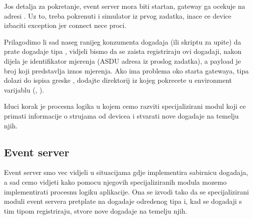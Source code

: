 \documentclass[letterpaper,10pt,croatian]{sphinxmanual}
\begin{document}
\begin{sphinxVerbatim}[commandchars=\\\{\}]
 


   
\end{sphinxVerbatim}

\sphinxAtStartPar
Jos detalja za pokretanje, event server mora biti startan, gateway ga ocekuje
na adresi . Uz to, treba pokrenuti i simulator iz
prvog zadatka, inace ce device izbaciti exception jer connect nece proci.

\sphinxAtStartPar
Prilagodimo li sad naseg ranijeg konzumenta dogadaja (ili skriptu za upite) da
prate dogadaje tipa ,
vidjeli bismo da se zaista registriraju ovi dogadaji, nakon  dijela
je identifikator mjerenja (ASDU adresa iz proslog zadatka), a payload je broj
koji predstavlja iznos mjerenja. Ako ima problema oko starta gatewaya, tipa
dolazi do ispisa greske , dodajte direktorij iz kojeg
pokrecete u environment varijablu  (, ).

\sphinxAtStartPar
Iduci korak je procesna logika u kojem cemo razviti specijalizirani modul koji
ce primati informacije o strujama od devicea i stvarati nove dogadaje na
temelju njih.


\subsection{Event server}
\label{\detokenize{hat/components:event-server}}
\noindent{}

\sphinxAtStartPar
Event server smo vec vidjeli u situacijama gdje implementira sabirnicu
dogadaja, a sad cemo vidjeti kako pomocu njegovih specijaliziranih modula
mozemo implementirati procesnu logiku aplikacije. Ona se izvodi tako da se
specijalizirani moduli event servera pretplate na dogadaje odredenog tipa i,
kad se dogadaji s tim tipom registriraju, stvore nove dogadaje na temelju njih.
\end{document}
